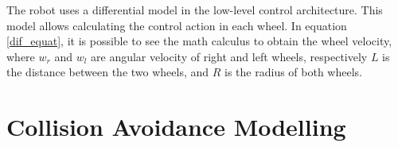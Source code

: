 The robot uses a differential model in the low-level control architecture. This model allows calculating the control action in each wheel. In equation \eqref{dif_equat}, it is possible to see the math calculus to obtain the wheel velocity, where $w_{r}$ and $w_{l}$ are angular velocity of right and left wheels, respectively $L$ is the distance between the two wheels, and $R$ is the radius of both wheels. 







\section{Collision Avoidance Modelling}